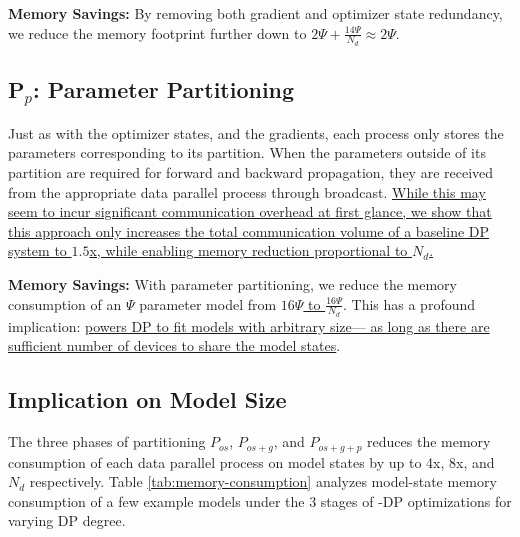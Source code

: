 \textbf{Memory Savings:} By removing both gradient and optimizer state redundancy, we reduce the memory footprint further down to \uline{$ 2 \Psi + \frac{14\Psi}{N_d} \approx 2 \Psi$}.

\subsection{P$_p$: Parameter Partitioning}\label{sec:pp}

Just as with the optimizer states, and the gradients, each process only stores the parameters corresponding to its partition. When the parameters outside of its partition are required for forward and backward propagation, they are received from the appropriate data parallel process through broadcast. \uline{While this may seem to incur significant communication overhead at first glance, we show that this approach only increases the total communication volume of a baseline DP system to $1.5$x, while enabling memory reduction proportional to $N_d$.}

\textbf{Memory Savings:} With parameter partitioning, we reduce the memory consumption of an $\Psi$ parameter model from \uline{$16\Psi$ to $\frac{16\Psi}{N_d}$}.  This has a profound implication: \uline{\name powers DP to fit models with arbitrary size— as long as there are sufficient number of devices to share the model states}.

\subsection{Implication on Model Size}\label{sec:summarymemoryoptimization}

The three phases of partitioning $P_{os}$, $P_{os+g}$, and $P_{os+g+p}$ reduces the memory consumption of each data parallel process on model states by up to 4x, 8x, and $N_d$ respectively.
Table \ref{tab:memory-consumption} analyzes model-state memory consumption of a few example models under the 3 stages of \name-DP optimizations for varying DP degree.
  
